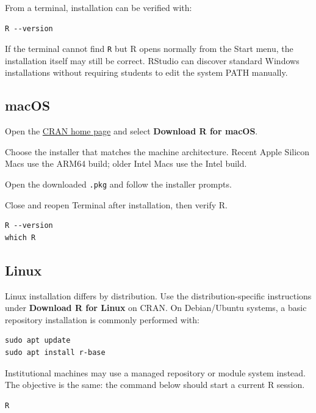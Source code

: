 From a terminal, installation can be verified with:

\begin{lstlisting}[style=mlterminal]
R --version
\end{lstlisting}

If the terminal cannot find \texttt{R} but R opens normally from the Start menu, the installation itself may still be correct. RStudio can discover standard Windows installations without requiring students to edit the system PATH manually.

\subsection{macOS}

\begin{mlsteps}
  \item Open the \href{https://cran.r-project.org/}{CRAN home page} and select \textbf{Download R for macOS}.
  \item Choose the installer that matches the machine architecture. Recent Apple Silicon Macs use the ARM64 build; older Intel Macs use the Intel build.
  \item Open the downloaded \texttt{.pkg} and follow the installer prompts.
  \item Close and reopen Terminal after installation, then verify R.
\end{mlsteps}

\begin{lstlisting}[style=mlterminal]
R --version
which R
\end{lstlisting}

\subsection{Linux}

Linux installation differs by distribution. Use the distribution-specific instructions under \textbf{Download R for Linux} on CRAN. On Debian/Ubuntu systems, a basic repository installation is commonly performed with:

\begin{lstlisting}[style=mlterminal]
sudo apt update
sudo apt install r-base
\end{lstlisting}

Institutional machines may use a managed repository or module system instead. The objective is the same: the command below should start a current R session.

\begin{lstlisting}[style=mlterminal]
R
\end{lstlisting}

